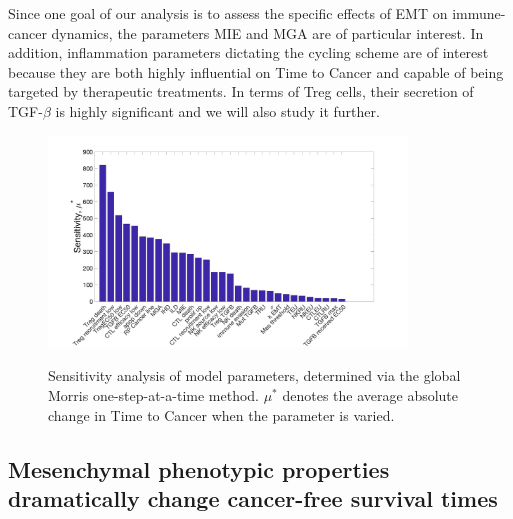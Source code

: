 \documentclass[11pt]{article}
\begin{document}
Since one goal of our analysis is to assess the specific effects of EMT on immune-cancer dynamics, the parameters MIE and MGA are of particular interest.
In addition, inflammation parameters dictating the cycling scheme are of interest because they are both highly influential on Time to Cancer and capable of being targeted by therapeutic treatments.
In terms of Treg cells, their secretion of TGF-$\beta$ is highly significant and we will also study it further.


\begin{figure}
\center
{\includegraphics[width=0.85\textwidth]{Figure2/Figure2.jpg}}
\caption{Sensitivity analysis of model parameters, determined via the global Morris one-step-at-a-time method. $\mu^*$ denotes the average absolute change in Time to Cancer when the parameter is varied.}
\label{fig:MOAT}
\end{figure}




\subsection{Mesenchymal phenotypic properties dramatically change cancer-free survival times}\label{MesPars}
\end{document}
